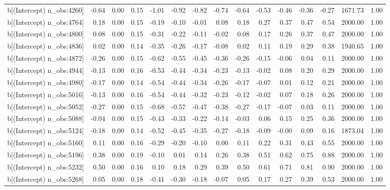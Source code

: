 \begin{table}[ht]
\begin{tabular}{rrrrrrrrrrrrrrr}
  b[(Intercept) n\_obs:4260] & -0.64 & 0.00 & 0.15 & -1.01 & -0.92 & -0.82 & -0.74 & -0.64 & -0.53 & -0.46 & -0.36 & -0.27 & 1671.73 & 1.00 \\ 
  b[(Intercept) n\_obs:4764] & 0.18 & 0.00 & 0.15 & -0.19 & -0.10 & -0.01 & 0.08 & 0.18 & 0.27 & 0.37 & 0.47 & 0.54 & 2000.00 & 1.00 \\ 
  b[(Intercept) n\_obs:4800] & 0.08 & 0.00 & 0.15 & -0.31 & -0.22 & -0.11 & -0.02 & 0.08 & 0.17 & 0.26 & 0.37 & 0.47 & 2000.00 & 1.00 \\ 
  b[(Intercept) n\_obs:4836] & 0.02 & 0.00 & 0.14 & -0.35 & -0.26 & -0.17 & -0.08 & 0.02 & 0.11 & 0.19 & 0.29 & 0.38 & 1940.65 & 1.00 \\ 
  b[(Intercept) n\_obs:4872] & -0.26 & 0.00 & 0.15 & -0.62 & -0.55 & -0.45 & -0.36 & -0.26 & -0.15 & -0.06 & 0.04 & 0.11 & 2000.00 & 1.00 \\ 
  b[(Intercept) n\_obs:4944] & -0.13 & 0.00 & 0.16 & -0.53 & -0.44 & -0.34 & -0.23 & -0.13 & -0.02 & 0.08 & 0.20 & 0.29 & 2000.00 & 1.00 \\ 
  b[(Intercept) n\_obs:4980] & -0.17 & 0.00 & 0.14 & -0.54 & -0.44 & -0.34 & -0.26 & -0.17 & -0.07 & 0.01 & 0.12 & 0.21 & 2000.00 & 1.00 \\ 
  b[(Intercept) n\_obs:5016] & -0.13 & 0.00 & 0.16 & -0.54 & -0.44 & -0.32 & -0.23 & -0.12 & -0.02 & 0.07 & 0.18 & 0.26 & 2000.00 & 1.00 \\ 
  b[(Intercept) n\_obs:5052] & -0.27 & 0.00 & 0.15 & -0.68 & -0.57 & -0.47 & -0.38 & -0.27 & -0.17 & -0.07 & 0.03 & 0.11 & 2000.00 & 1.00 \\ 
  b[(Intercept) n\_obs:5088] & -0.04 & 0.00 & 0.15 & -0.43 & -0.33 & -0.22 & -0.14 & -0.03 & 0.06 & 0.15 & 0.25 & 0.36 & 2000.00 & 1.00 \\ 
  b[(Intercept) n\_obs:5124] & -0.18 & 0.00 & 0.14 & -0.52 & -0.45 & -0.35 & -0.27 & -0.18 & -0.09 & -0.00 & 0.09 & 0.16 & 1873.04 & 1.00 \\ 
  b[(Intercept) n\_obs:5160] & 0.11 & 0.00 & 0.16 & -0.29 & -0.20 & -0.10 & 0.00 & 0.11 & 0.22 & 0.31 & 0.43 & 0.55 & 2000.00 & 1.00 \\ 
  b[(Intercept) n\_obs:5196] & 0.38 & 0.00 & 0.19 & -0.10 & 0.01 & 0.14 & 0.26 & 0.38 & 0.51 & 0.62 & 0.75 & 0.88 & 2000.00 & 1.00 \\ 
  b[(Intercept) n\_obs:5232] & 0.50 & 0.00 & 0.16 & 0.10 & 0.18 & 0.29 & 0.39 & 0.50 & 0.61 & 0.71 & 0.81 & 0.90 & 2000.00 & 1.00 \\ 
  b[(Intercept) n\_obs:5268] & 0.05 & 0.00 & 0.18 & -0.41 & -0.30 & -0.18 & -0.07 & 0.05 & 0.17 & 0.27 & 0.39 & 0.53 & 2000.00 & 1.00 \\ 

\end{tabular}
\end{table}
